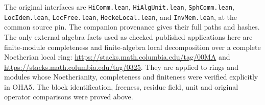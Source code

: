 The original interfaces are \texttt{HiComm.lean},
\texttt{HiAlgUnit.lean}, \texttt{SphComm.lean},
\texttt{LocIdem.lean}, \texttt{LocFree.lean},
\texttt{HeckeLocal.lean}, and \texttt{InvMem.lean}, at the common
source pin. The companion provenance gives their full paths and
hashes. The only external algebra facts used as checked published
applications here are finite-module completeness and finite-algebra
local decomposition over a complete Noetherian local ring:
\url{https://stacks.math.columbia.edu/tag/00MA} and
\url{https://stacks.math.columbia.edu/tag/0325}.
They are applied to rings and modules whose Noetherianity,
completeness and finiteness were verified explicitly in OHA5.
The block identification, freeness, residue field, unit and
original operator comparisons were proved above.
